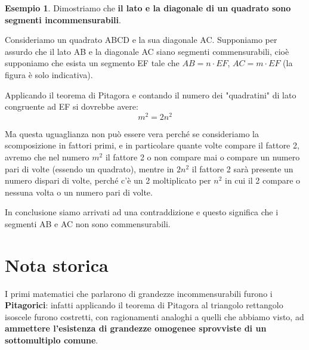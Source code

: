 \documentclass[a4paper,12pt]{article}
\theoremstyle{definition}
\newtheorem{esempio}{Esempio}[section]
\theoremstyle{remark}
\begin{document}
\begin{esempio}
Dimostriamo che \textbf{il lato e la diagonale di un quadrato sono segmenti incommensurabili}.

Consideriamo un quadrato ABCD e la sua diagonale AC.
Supponiamo per assurdo che il lato AB e la diagonale AC siano segmenti commensurabili, cioè supponiamo che esista un segmento EF tale che $AB = n \cdot EF$, $AC = m \cdot EF$ (la figura è solo indicativa).

\begin{center}
\end{center}

Applicando il teorema di Pitagora e contando il numero dei "quadratini" di lato congruente ad EF si dovrebbe avere:
$$m^2 = 2n^2$$

Ma questa uguaglianza non può essere vera perché se consideriamo la scomposizione in fattori primi, e in particolare quante volte compare il fattore 2, avremo che nel numero $m^2$ il fattore 2 o non compare mai o compare un numero pari di volte (essendo un quadrato), mentre in $2n^2$ il fattore 2 sarà presente un numero dispari di volte, perché c'è un 2 moltiplicato per $n^2$ in cui il 2 compare o nessuna volta o un numero pari di volte.

In conclusione siamo arrivati ad una contraddizione e questo significa che i segmenti AB e AC non sono commensurabili.
\end{esempio}

\newpage

\section{Nota storica}

I primi matematici che parlarono di grandezze incommensurabili furono i \textbf{Pitagorici}: infatti applicando il teorema di Pitagora al triangolo rettangolo isoscele furono costretti, con ragionamenti analoghi a quelli che abbiamo visto, ad \textbf{ammettere l'esistenza di grandezze omogenee sprovviste di un sottomultiplo comune}.
\end{document}
